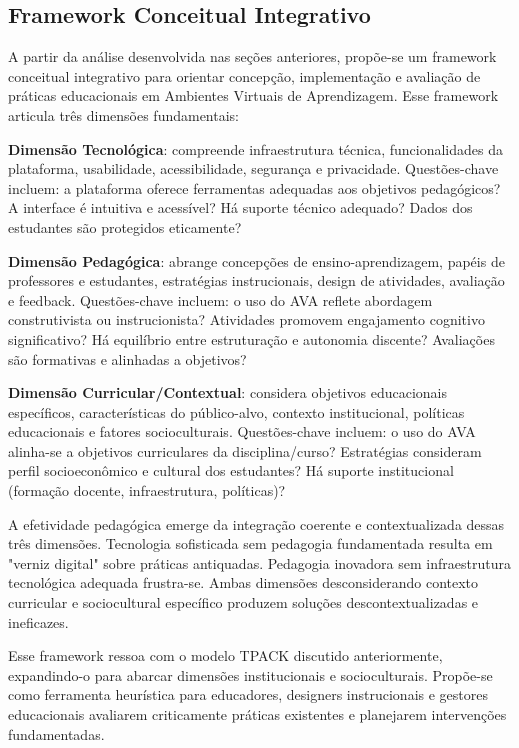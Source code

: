 \documentclass[portuguese]{sbc2025}%
\begin{document}
\subsection{Framework Conceitual Integrativo}

A partir da análise desenvolvida nas seções anteriores, propõe-se um framework conceitual integrativo para orientar concepção, implementação e avaliação de práticas educacionais em Ambientes Virtuais de Aprendizagem. Esse framework articula três dimensões fundamentais:

\textbf{Dimensão Tecnológica}: compreende infraestrutura técnica, funcionalidades da plataforma, usabilidade, acessibilidade, segurança e privacidade. Questões-chave incluem: a plataforma oferece ferramentas adequadas aos objetivos pedagógicos? A interface é intuitiva e acessível? Há suporte técnico adequado? Dados dos estudantes são protegidos eticamente?

\textbf{Dimensão Pedagógica}: abrange concepções de ensino-aprendizagem, papéis de professores e estudantes, estratégias instrucionais, design de atividades, avaliação e feedback. Questões-chave incluem: o uso do AVA reflete abordagem construtivista ou instrucionista? Atividades promovem engajamento cognitivo significativo? Há equilíbrio entre estruturação e autonomia discente? Avaliações são formativas e alinhadas a objetivos?

\textbf{Dimensão Curricular/Contextual}: considera objetivos educacionais específicos, características do público-alvo, contexto institucional, políticas educacionais e fatores socioculturais. Questões-chave incluem: o uso do AVA alinha-se a objetivos curriculares da disciplina/curso? Estratégias consideram perfil socioeconômico e cultural dos estudantes? Há suporte institucional (formação docente, infraestrutura, políticas)?

A efetividade pedagógica emerge da integração coerente e contextualizada dessas três dimensões. Tecnologia sofisticada sem pedagogia fundamentada resulta em "verniz digital" sobre práticas antiquadas. Pedagogia inovadora sem infraestrutura tecnológica adequada frustra-se. Ambas dimensões desconsiderando contexto curricular e sociocultural específico produzem soluções descontextualizadas e ineficazes.

Esse framework ressoa com o modelo TPACK discutido anteriormente, expandindo-o para abarcar dimensões institucionais e socioculturais. Propõe-se como ferramenta heurística para educadores, designers instrucionais e gestores educacionais avaliarem criticamente práticas existentes e planejarem intervenções fundamentadas.
\end{document}
